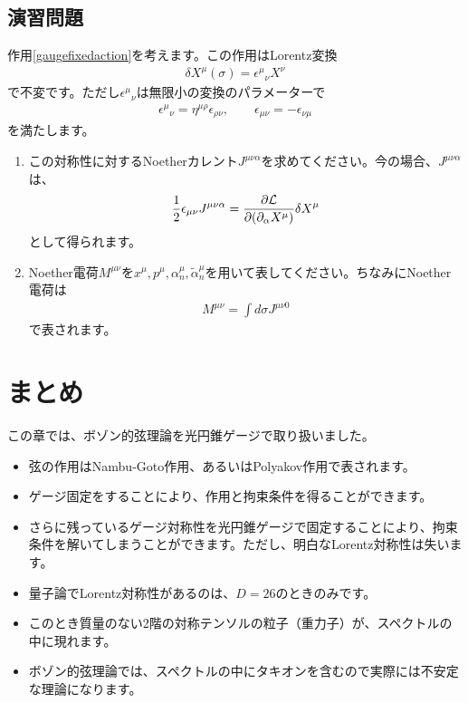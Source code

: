 \documentclass[report,paper=a4, fontsize=12pt, line_length=16cm, number_of_lines=34,dvipdfmx]{jlreq}
\numberwithin{equation}{chapter}
\numberwithin{equation}{section}
\newcommand{\del}{\partial}
\newcommand{\alphat}{\tilde{\alpha}}
\newcommand{\Lcal}{\mathcal{L}}
\begin{document}
\subsection*{演習問題}
作用\eqref{gaugefixedaction}を考えます。この作用はLorentz変換
\begin{align}
  \delta X^{\mu}(\sigma)=\epsilon^{\mu}{}_{\nu}X^{\nu}
\end{align}
で不変です。ただし$\epsilon^{\mu}{}_{\nu}$は無限小の変換のパラメーターで
\begin{align}
  \epsilon^{\mu}{}_{\nu}=\eta^{\mu\rho}\epsilon_{\rho\nu},\qquad \epsilon_{\mu\nu}=-\epsilon_{\nu\mu}
\end{align}
を満たします。
\begin{enumerate}
\item この対称性に対するNoetherカレント$J^{\mu\nu\alpha}$を求めてください。今の場合、$J^{\mu\nu\alpha}$は、
\begin{align}
  \frac12 \epsilon_{\mu\nu}J^{\mu\nu\alpha}=\pdv{\Lcal}{(\del_{\alpha}X^{\mu})}\delta X^{\mu}
\end{align}
として得られます。
\item Noether電荷$M^{\mu\nu}$を$x^{\mu},p^{\mu},\alpha^{\mu}_{n},\alphat^{\mu}_{n}$を用いて表してください。ちなみにNoether電荷は
\begin{align}
  M^{\mu\nu}=\int d\sigma J^{\mu\nu 0}
\end{align}
で表されます。
\end{enumerate}


\section{まとめ}
この章では、ボゾン的弦理論を光円錐ゲージで取り扱いました。
\begin{itemize}
  \item 弦の作用はNambu-Goto作用、あるいはPolyakov作用で表されます。
  \item ゲージ固定をすることにより、作用と拘束条件を得ることができます。
  \item さらに残っているゲージ対称性を光円錐ゲージで固定することにより、拘束条件を解いてしまうことができます。ただし、明白なLorentz対称性は失います。
  \item 量子論でLorentz対称性があるのは、$D=26$のときのみです。
  \item このとき質量のない2階の対称テンソルの粒子（重力子）が、スペクトルの中に現れます。
  \item ボゾン的弦理論では、スペクトルの中にタキオンを含むので実際には不安定な理論になります。
\end{itemize}
\end{document}

